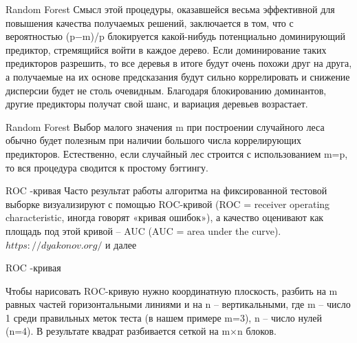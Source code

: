 \documentclass{beamer}
\begin{document}
\begin{frame}{Random Forest}
Смысл этой процедуры, оказавшейся весьма эффективной для повышения качества получаемых решений, заключается в том, что с вероятностью (p−m)/p
блокируется какой-нибудь потенциально доминирующий предиктор, стремящийся войти в каждое дерево. Если доминирование таких предикторов разрешить, то все деревья в итоге будут очень похожи друг на друга, а получаемые на их основе предсказания будут сильно коррелировать и снижение дисперсии будет не столь очевидным. Благодаря блокированию доминантов, другие предикторы получат свой шанс, и вариация деревьев возрастает.
\end{frame}

\begin{frame}{Random Forest}
Выбор малого значения m при построении случайного леса обычно будет полезным при наличии большого числа коррелирующих предикторов. Естественно, если случайный лес строится с использованием m=p, то вся процедура сводится к простому бэггингу.
\end{frame}


\begin{frame}{ROC -кривая}
Часто результат работы алгоритма на фиксированной 
тестовой выборке визуализируют с помощью ROC-кривой 
(ROC = receiver operating characteristic, 
иногда говорят «кривая ошибок»), а качество оценивают как площадь 
под этой кривой – AUC (AUC = area under the curve).
$https://dyakonov.org/$ и далее

\end{frame}
\begin{table}[tab:roccurve]
\caption{Таблица для построения ROC-кривой}
\label{tab:my-table}
\end{table}

\begin{frame}{ROC -кривая}

Чтобы нарисовать ROC-кривую  нужно координатную плоскость, разбить на m равных частей горизонтальными линиями 
и на n – вертикальными, где m – число 1 среди правильных меток теста (в нашем примере m=3), n – число нулей (n=4). 
В результате квадрат разбивается сеткой на m×n блоков.
\end{frame}
\end{document}
